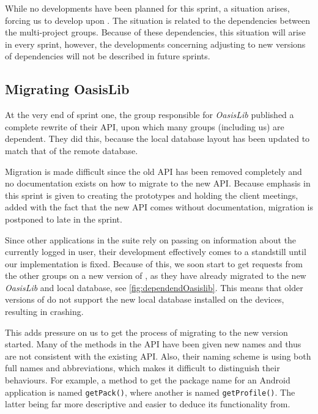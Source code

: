 While no developments have been planned for this sprint, a situation arises, forcing us to develop upon \launcher.
The situation is related to the dependencies between the multi-project groups.
Because of these dependencies, this situation will arise in every sprint, however, the developments concerning adjusting to new versions of dependencies will not be described in future sprints.

\subsection{Migrating OasisLib}\label{sec:oasismigration}
At the very end of sprint one, the group responsible for \textit{OasisLib} published a complete rewrite of their API, upon which many groups (including us) are dependent.
They did this, because the local database layout has been updated to match that of the remote database.

Migration is made difficult since the old API has been removed completely and no documentation exists on how to migrate to the new API.
Because emphasis in this sprint is given to creating the prototypes and holding the client meetings, added with the fact that the new API comes without documentation, migration is postponed to late in the sprint.

Since other applications in the \giraf suite rely on \launcher passing on information about the currently logged in user, their development effectively comes to a standstill until our implementation is fixed.
Because of this, we soon start to get requests from the other groups on a new version of \launcher, as they have already migrated to the new \textit{OasisLib} and local database, see \cref{fig:dependendOasislib}.
This means that older versions of \launcher do not support the new local database installed on the devices, resulting in \launcher crashing.


This adds pressure on us to get the process of migrating to the new version started.
Many of the methods in the API have been given new names and thus are not consistent with the existing API.
Also, their naming scheme is using both full names and abbreviations, which makes it difficult to distinguish their behaviours.
For example, a method to get the package name for an Android application is named \lstinline{getPack()}, where another is named \lstinline{getProfile()}.
The latter being far more descriptive and easier to deduce its functionality from.

